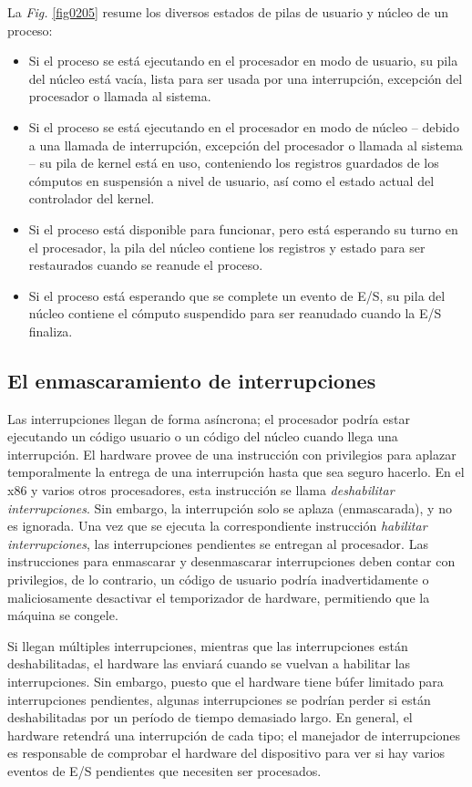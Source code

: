 \documentclass[10pt]{book}
\begin{document}
La \textit{Fig.} \ref{fig0205} resume los diversos estados de pilas de usuario y núcleo de un proceso:
\begin{itemize}
\item Si el proceso se está ejecutando en el procesador en modo de usuario, su pila del núcleo está vacía, lista para ser usada por una interrupción, excepción del procesador o llamada al sistema.

\item Si el proceso se está ejecutando en el procesador en modo de núcleo -- debido a una llamada de interrupción, excepción del procesador o llamada al sistema -- su pila de kernel está en uso, conteniendo los registros guardados de los cómputos en suspensión a nivel de usuario, así como el estado actual del controlador del kernel.

\item Si el proceso está disponible para funcionar, pero está esperando su turno en el procesador, la pila del núcleo contiene los registros y estado para ser restaurados cuando se reanude el proceso.

\item Si el proceso está esperando que se complete un evento de E/S, su pila del núcleo contiene el cómputo suspendido para ser reanudado cuando la E/S finaliza.
\end{itemize}

\subsection{El enmascaramiento de interrupciones}
Las interrupciones llegan de forma asíncrona; el procesador podría estar ejecutando un código usuario o un código del núcleo cuando llega una interrupción. El hardware provee de una instrucción con privilegios para aplazar temporalmente la entrega de una interrupción hasta que sea seguro hacerlo. En el {\mf x86} y varios otros procesadores, esta instrucción se llama \textit{deshabilitar interrupciones}. Sin embargo, la interrupción solo se aplaza (enmascarada), y no es ignorada. Una vez que se ejecuta la correspondiente instrucción \textit{habilitar interrupciones}, las interrupciones pendientes se entregan al procesador. Las instrucciones para enmascarar y desenmascarar interrupciones deben contar con privilegios, de lo contrario, un código de usuario podría inadvertidamente o maliciosamente desactivar el temporizador de hardware, permitiendo que la máquina se congele.

Si llegan múltiples interrupciones, mientras que las interrupciones están deshabilitadas, el hardware las enviará cuando se vuelvan a habilitar las interrupciones. Sin embargo, puesto que el hardware tiene búfer limitado para interrupciones pendientes, algunas interrupciones se podrían perder si están deshabilitadas por un período de tiempo demasiado largo. En general, el hardware retendrá una interrupción de cada tipo; el manejador de interrupciones es responsable de comprobar el hardware del dispositivo para ver si hay varios eventos de E/S pendientes que necesiten ser procesados.
\end{document}
